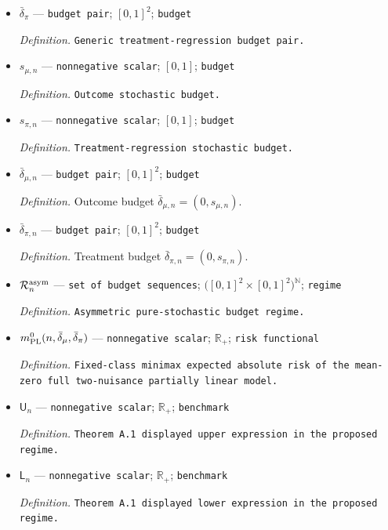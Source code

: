 \documentclass{article}
\begin{document}
\begin{itemize}
  \par\smallskip\noindent\emph{Definition.} \texttt{Generic outcome budget pair.}
  \item \(\bar\delta_\pi\) --- \texttt{budget pair}; \([0,1]^2\); \texttt{budget}
  \par\smallskip\noindent\emph{Definition.} \texttt{Generic treatment-\allowbreak{}regression budget pair.}
  \item \(s_{\mu,n}\) --- \texttt{nonnegative scalar}; \([0,1]\); \texttt{budget}
  \par\smallskip\noindent\emph{Definition.} \texttt{Outcome stochastic budget.}
  \item \(s_{\pi,n}\) --- \texttt{nonnegative scalar}; \([0,1]\); \texttt{budget}
  \par\smallskip\noindent\emph{Definition.} \texttt{Treatment-\allowbreak{}regression stochastic budget.}
  \item \(\bar\delta_{\mu,n}\) --- \texttt{budget pair}; \([0,1]^2\); \texttt{budget}
  \par\smallskip\noindent\emph{Definition.} Outcome budget \(\bar\delta_{\mu,n}=(0,s_{\mu,n})\).
  \item \(\bar\delta_{\pi,n}\) --- \texttt{budget pair}; \([0,1]^2\); \texttt{budget}
  \par\smallskip\noindent\emph{Definition.} Treatment budget \(\bar\delta_{\pi,n}=(0,s_{\pi,n})\).
  \item \(\mathcal R_n^{\rm asym}\) --- \texttt{set of budget sequences}; \(\bigl([0,1]^2\times[0,1]^2\bigr)^{\mathbb N}\); \texttt{regime}
  \par\smallskip\noindent\emph{Definition.} \texttt{Asymmetric pure-\allowbreak{}stochastic budget regime.}
  \item \(m_{\rm PL}^{0}(n,\bar\delta_\mu,\bar\delta_\pi)\) --- \texttt{nonnegative scalar}; \(\mathbb R_+\); \texttt{risk functional}
  \par\smallskip\noindent\emph{Definition.} \texttt{Fixed-\allowbreak{}class minimax expected absolute risk of the mean-\allowbreak{}zero full two-\allowbreak{}nuisance partially linear model.}
  \item \(\mathsf U_n\) --- \texttt{nonnegative scalar}; \(\mathbb R_+\); \texttt{benchmark}
  \par\smallskip\noindent\emph{Definition.} \texttt{Theorem A.1 displayed upper expression in the proposed regime.}
  \item \(\mathsf L_n\) --- \texttt{nonnegative scalar}; \(\mathbb R_+\); \texttt{benchmark}
  \par\smallskip\noindent\emph{Definition.} \texttt{Theorem A.1 displayed lower expression in the proposed regime.}

\end{itemize}
\end{document}
